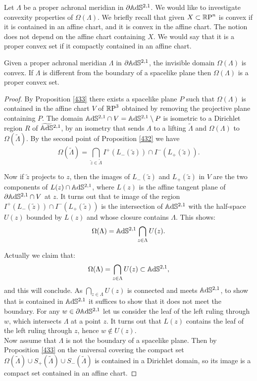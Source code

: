Let $\Lambda$ be a proper achronal meridian in $\partial\mathbb{A}\mathrm{d}\mathbb{S}^{2,1}$. We would like to investigate convexity properties of $\Omega(\Lambda)$. We briefly recall that given $X \subset \mathbb{R}\text{P}^n$ is convex if it is contained in an affine chart, and it is convex in the affine chart. The notion does not depend on the affine chart containing $X$. We would say that it is a proper convex set if it compactly contained in an affine chart. 

\begin{proposition}\label{461}
    Given a proper achronal meridian $\Lambda$ in $\partial\mathbb{A}\mathrm{d}\mathbb{S}^{2,1}$, the invisible domain $\Omega(\Lambda)$ is convex. If $\Lambda$ is different from the boundary of a spacelike plane then $\Omega(\Lambda)$ is a proper convex set.
\end{proposition}

\begin{proof}
    By Proposition \ref{433} there exists a spacelike plane $P$ such that $\Omega(\Lambda)$ is contained in the affine chart $V$ of $\mathbb{R}\text{P}^3$ obtained by removing the projective plane containing $P$. The domain $\mathbb{A}\mathrm{d}\mathbb{S}^{2,1}\cap V=\mathbb{A}\mathrm{d}\mathbb{S}^{2,1}\setminus P$ is isometric to a Dirichlet region $R$ of $\widetilde{\mathbb{A}\mathrm{d}\mathbb{S}}{}^{2,1}$, by an isometry that sends $\Lambda$ to a lifting $\widetilde{\Lambda}$ and $\Omega(\Lambda)$ to $\Omega(\widetilde{\Lambda})$. By the second point of Proposition \ref{432} we have 
    \[
        \Omega(\widetilde{\Lambda})=\bigcap_{\widetilde{z}\in\widetilde{\Lambda}}I^+(L_-(\widetilde{z}))\cap I^-(L_+(\widetilde{z})).
    \]

    Now if $\widetilde{z}$ projects to $z$, then the images of $L_-(\widetilde{z})$ and $L_+(\widetilde{z})$ in $V$ are the two components of $L(z)\cap \mathbb{A}\mathrm{d}\mathbb{S}^{2,1}$, where $L(z)$ is the affine tangent plane of $\partial\mathbb{A}\mathrm{d}\mathbb{S}^{2,1}\cap V$ at $z$. It turns out that te image of the region $I^+(L_-(\widetilde{z}))\cap I^-(L_+(\widetilde{z}))$ is the intersection of $\mathbb{A}\mathrm{d}\mathbb{S}^{2,1}$ with the half-space $U(z)$ bounded by $L(z)$ and whose closure contains $\Lambda$. This shows: 
\[
    \Omega(\Lambda)=\mathbb{A}\mathrm{d}\mathbb{S}^{2,1}\bigcap_{z\in\Lambda}U(z).
\] 

Actually we claim that:
\[
    \Omega(\Lambda)=\bigcap_{z\in\Lambda}U(z)\subset \mathbb{A}\mathrm{d}\mathbb{S}^{2,1},
\]
and this will conclude. As $\bigcap_{z\in\Lambda}U(z)$ is connected and meets $\mathbb{A}\mathrm{d}\mathbb{S}^{2,1}$, to show that is contained in $\mathbb{A}\mathrm{d}\mathbb{S}^{2,1}$ it suffices to show that it does not meet the boundary. For any $w\in\partial\mathbb{A}\mathrm{d}\mathbb{S}^{2,1}$ let us consider the leaf of the left ruling through $w$, which intersects $\Lambda$ at a point $z$. It turns out that $L(z)$ contains the leaf of the left ruling through $z$, hence $w\notin U(z)$. \\
Now assume that $\Lambda$ is not the boundary of a spacelike plane. Then by Proposition \ref{433} on the universal covering the compact set $\Omega(\widetilde{\Lambda})\cup S_+(\widetilde{\Lambda})\cup S_-(\widetilde{\Lambda})$ is contained in a Dirichlet domain, so its image is a compact set contained in an affine chart.
\end{proof}

